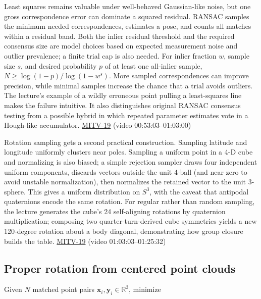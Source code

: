 Least squares remains valuable under well-behaved Gaussian-like noise, but one gross correspondence error can dominate a squared residual. RANSAC samples the minimum needed correspondences, estimates a pose, and counts all matches within a residual band. Both the inlier residual threshold and the required consensus size are model choices based on expected measurement noise and outlier prevalence; a finite trial cap is also needed. For inlier fraction \(w\), sample size \(s\), and desired probability \(p\) of at least one all-inlier sample, \(N\ge\log(1-p)/\log(1-w^s)\). More sampled correspondences can improve precision, while minimal samples increase the chance that a trial avoids outliers. The lecture's example of a wildly erroneous point pulling a least-squares line makes the failure intuitive. It also distinguishes original RANSAC consensus testing from a possible hybrid in which repeated parameter estimates vote in a Hough-like accumulator. \hyperref[04-visual-computing-ii-ch036-mitv-19---absolute-orientation-in-closed-form-outliers-and-robustness-ransac]{MITV-19} (video 00:53:03--01:03:00)

Rotation sampling gets a second practical construction. Sampling latitude and longitude uniformly clusters near poles. Sampling a uniform point in a 4-D cube and normalizing is also biased; a simple rejection sampler draws four independent uniform components, discards vectors outside the unit 4-ball (and near zero to avoid unstable normalization), then normalizes the retained vector to the unit 3-sphere. This gives a uniform distribution on \(S^3\), with the caveat that antipodal quaternions encode the same rotation. For regular rather than random sampling, the lecture generates the cube's 24 self-aligning rotations by quaternion multiplication; composing two quarter-turn-derived cube symmetries yields a new 120-degree rotation about a body diagonal, demonstrating how group closure builds the table. \hyperref[04-visual-computing-ii-ch036-mitv-19---absolute-orientation-in-closed-form-outliers-and-robustness-ransac]{MITV-19} (video 01:03:03--01:25:32)

\subsection{Proper rotation from centered point clouds}\label{04-visual-computing-ii-ch032-proper-rotation-from-centered-point-clouds}

Given \(N\) matched point pairs \(\mathbf x_i,\mathbf y_i\in\mathbb R^3\), minimize

